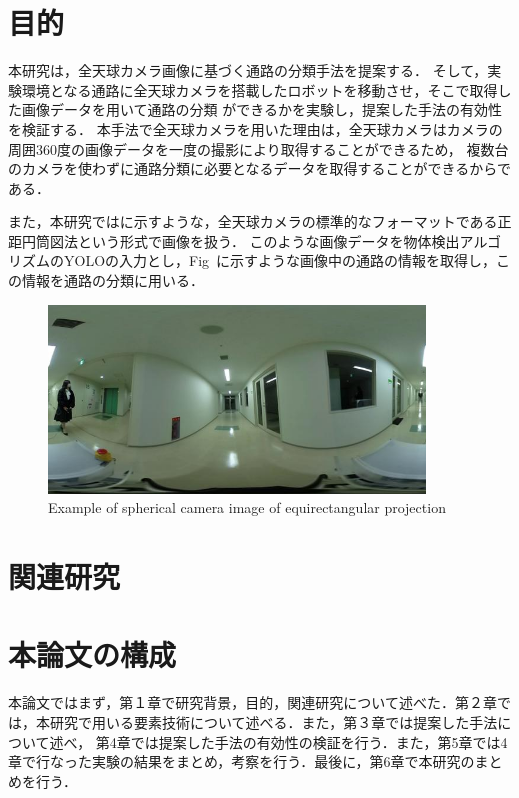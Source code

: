 \documentclass[../main]{subfiles}
\begin{document}
        \section{目的}
        本研究は，全天球カメラ画像に基づく通路の分類手法を提案する．
        そして，実験環境となる通路に全天球カメラを搭載したロボットを移動させ，そこで取得した画像データを用いて通路の分類
        ができるかを実験し，提案した手法の有効性を検証する．
        本手法で全天球カメラを用いた理由は，全天球カメラはカメラの周囲360度の画像データを一度の撮影により取得することができるため，
        複数台のカメラを使わずに通路分類に必要となるデータを取得することができるからである．

        また，本研究ではに示すような，全天球カメラの標準的なフォーマットである正距円筒図法という形式で画像を扱う．
        このような画像データを物体検出アルゴリズムのYOLOの入力とし，Fig~に示すような画像中の通路の情報を取得し，この情報を通路の分類に用いる．

        \begin{figure}[H]
            \centering
            \includegraphics[width=10cm]{../images/18F_aisle_exp.jpg}
            \caption{Example of spherical camera image of equirectangular projection}
            \label{figure::image_exp}
        \end{figure}
        
        \newpage

        \section{関連研究}
        

        \section{本論文の構成}
        本論文ではまず，第１章で研究背景，目的，関連研究について述べた．第２章では，本研究で用いる要素技術について述べる．また，第３章では提案した手法について述べ，
        第4章では提案した手法の有効性の検証を行う．また，第5章では4章で行なった実験の結果をまとめ，考察を行う．最後に，第6章で本研究のまとめを行う．
\end{document}
